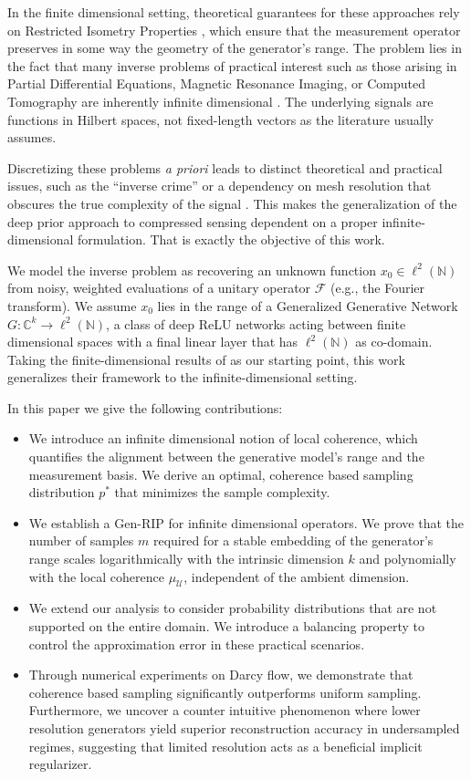 \documentclass[a4paper,oneside]{amsart}
\newcommand{\N}{\mathbb{N}}
\begin{document}
In the finite dimensional setting, theoretical guarantees for these approaches rely on Restricted Isometry Properties \cite{candes2005decoding, baraniuk2008simple}, which ensure that the measurement operator preserves in some way the geometry of the generator's range.
The problem lies in the fact that many inverse problems of practical interest such as those arising in Partial Differential Equations, Magnetic Resonance Imaging, or Computed Tomography are inherently infinite dimensional \cite{engl1996regularization}.
The underlying signals are functions in Hilbert spaces, not fixed-length vectors as the literature usually assumes.

Discretizing these problems \textit{a priori} leads to distinct theoretical and practical issues, such as the ``inverse crime'' or a dependency on mesh resolution that obscures the true complexity of the signal \cite{alberti2022infinite}.
This makes the generalization of the deep prior approach to compressed sensing dependent on a proper infinite-dimensional formulation. That is exactly the objective of this work.

We model the inverse problem as recovering an unknown function $x_0 \in \ell^2(\mathbb{N})$ from noisy, weighted evaluations of a unitary operator $\mathcal{F}$ (e.g., the Fourier transform).
We assume $x_0$ lies in the range of a Generalized Generative Network $G\colon \mathbb{C}^k \to \ell^2(\mathbb{N})$, a class of deep ReLU networks acting between finite dimensional spaces with a final linear layer that has $\ell^2(\N)$ as co-domain.
Taking the finite-dimensional results of \cite{berk2023model} as our starting point, this work generalizes their framework to the infinite-dimensional setting.

In this paper we give the following contributions:
\begin{itemize}
    \item We introduce an infinite dimensional notion of local coherence, which quantifies the alignment between the generative model's range and the measurement basis. We derive an optimal, coherence based sampling distribution $p^*$ that minimizes the sample complexity.
    \item We establish a Gen-RIP for infinite dimensional operators. We prove that the number of samples $m$ required for a stable embedding of the generator's range scales logarithmically with the intrinsic dimension $k$ and polynomially with the local coherence $\mu_\mathcal{U}$, independent of the ambient dimension.
    \item We extend our analysis to consider probability distributions that are not supported on the entire domain. We introduce a balancing property to control the approximation error in these practical scenarios.
    \item  Through numerical experiments on Darcy flow, we demonstrate that coherence based sampling significantly outperforms uniform sampling. Furthermore, we uncover a counter intuitive phenomenon where lower resolution generators yield superior reconstruction accuracy in undersampled regimes, suggesting that limited resolution acts as a beneficial implicit regularizer.
\end{itemize}
\end{document}
